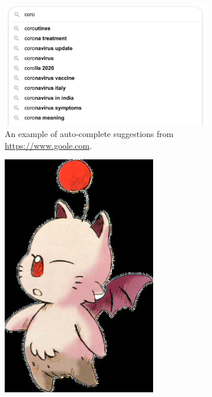 \documentclass[addpoints]{exam}
\begin{document}
\begin{figure}
  \centering
  \begin{subfigure}{.7\textwidth}
    \includegraphics[width=\textwidth]{autocomplete}
    \caption{An example of auto-complete suggestions from \url{https://www.goole.com}.}
    \label{fig:autocomplete}
  \end{subfigure}
  \begin{subfigure}{.2\textwidth}
    \includegraphics[width=\textwidth]{moogle}

\end{subfigure}
\end{figure}
\end{document}
